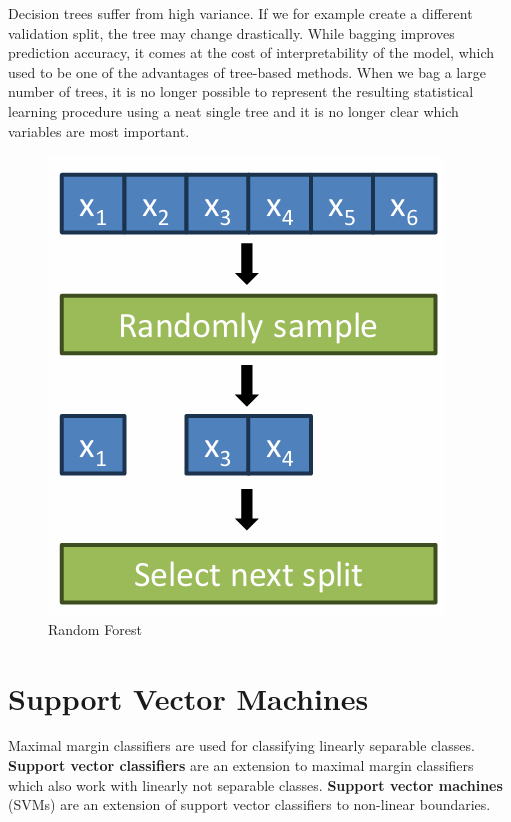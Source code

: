 \documentclass[../Main.tex]{subfiles}
\begin{document}
Decision trees suffer from high variance.
If we for example create a different validation split, the tree may change drastically.
While bagging improves prediction accuracy, it comes at the cost of 
interpretability of the model, which used to be one of the advantages of tree-based methods.
When we bag a large number of trees, it is no longer possible to represent the 
resulting statistical learning procedure using a neat single tree and it is no longer 
clear which variables are most important.


\begin{figure}[H]
    \centering
    \includegraphics[width=0.35\linewidth]{Images/random-forest.png}
    \caption{Random Forest}
\end{figure}


\newpage
\section{Support Vector Machines}
Maximal margin classifiers are used for classifying linearly separable classes.
\textbf{Support vector classifiers} are an extension to maximal margin 
classifiers which also work with linearly not separable classes.
\textbf{Support vector machines} (SVMs) are an extension of support vector classifiers to non-linear boundaries.
\end{document}
